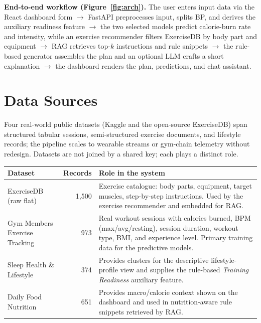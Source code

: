 \documentclass[10pt,a4paper]{article}
\begin{document}
\textbf{End-to-end workflow (Figure~\ref{fig:arch}).} The user enters input data via the React dashboard form $\rightarrow$ FastAPI preprocesses input, splits BP, and derives the auxiliary readiness feature $\rightarrow$ the two selected models predict calorie-burn rate and intensity, while an exercise recommender filters ExerciseDB by body part and equipment $\rightarrow$ RAG retrieves top-$k$ instructions and rule snippets $\rightarrow$ the rule-based generator assembles the plan and an optional LLM crafts a short explanation $\rightarrow$ the dashboard renders the plan, predictions, and chat assistant.

\section{Data Sources}
Four real-world public datasets (Kaggle and the open-source ExerciseDB) span structured tabular sessions, semi-structured exercise documents, and lifestyle records; the pipeline scales to wearable streams or gym-chain telemetry without redesign. Datasets are not joined by a shared key; each plays a distinct role.

\vspace{-2pt}
\begin{center}
\small
\renewcommand{\arraystretch}{1.1}
\begin{tabularx}{\linewidth}{l r X}
\toprule
\textbf{Dataset} & \textbf{Records} & \textbf{Role in the system} \\
\midrule
ExerciseDB (raw flat) & 1{,}500 & Exercise catalogue: body parts, equipment, target muscles, step-by-step instructions. Used by the exercise recommender and embedded for RAG. \\
Gym Members Exercise Tracking & 973 & Real workout sessions with calories burned, BPM (max/avg/resting), session duration, workout type, BMI, and experience level. Primary training data for the predictive models. \\
Sleep Health \& Lifestyle & 374 & Provides clusters for the descriptive lifestyle-profile view and supplies the rule-based \emph{Training Readiness} auxiliary feature. \\
Daily Food Nutrition & 651 & Provides macro/calorie context shown on the dashboard and used in nutrition-aware rule snippets retrieved by RAG. \\
\bottomrule
\end{tabularx}
\end{center}
\end{document}
